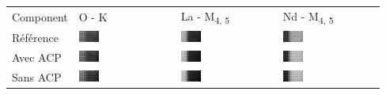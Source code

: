 \begin{tabular}{m{}*{3}{M{0.23\textwidth}}}
        Component&O - K&La - M\textsubscript{4, 5}&Nd - M\textsubscript{4, 5}\\
        Référence
        &\includegraphics[width=0.22\textwidth]{img/chapitre4/figure13/img/GT_0.png}
        &\includegraphics[width=0.22\textwidth]{img/chapitre4/figure13/img/GT_1.png}
        &\includegraphics[width=0.22\textwidth]{img/chapitre4/figure13/img/GT_2.png}
        \\
        Avec ACP
        &\includegraphics[width=0.22\textwidth]{img/chapitre4/figure13/img/PCA_0.png}
        &\includegraphics[width=0.22\textwidth]{img/chapitre4/figure13/img/PCA_1.png}
        &\includegraphics[width=0.22\textwidth]{img/chapitre4/figure13/img/PCA_2.png}
        \\
        Sans ACP
        &\includegraphics[width=0.22\textwidth]{img/chapitre4/figure13/img/Full_0.png}
        &\includegraphics[width=0.22\textwidth]{img/chapitre4/figure13/img/Full_1.png}
        &\includegraphics[width=0.22\textwidth]{img/chapitre4/figure13/img/Full_2.png}
        \\
\end{tabular}